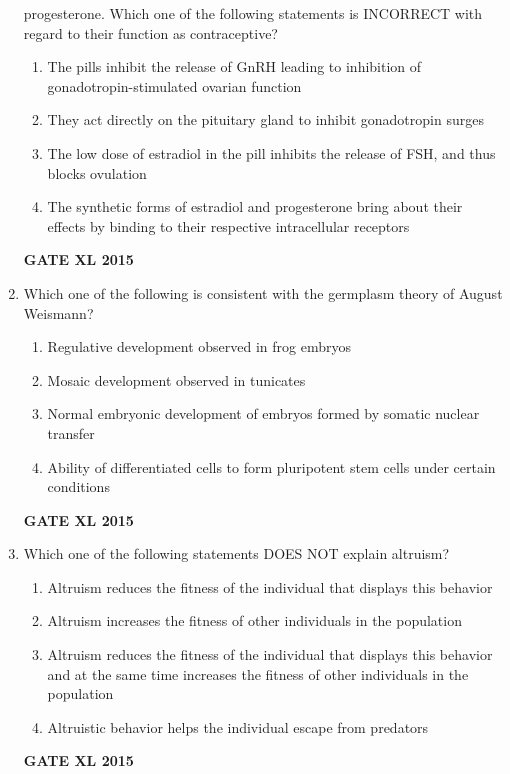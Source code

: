 \documentclass[journal,12pt,onecolumn]{IEEEtran}
\begin{document}
\begin{enumerate}
progesterone. Which one of the following statements is INCORRECT with regard to their function as contraceptive?
    \begin{enumerate}
            \item  The pills inhibit the release of GnRH leading to inhibition of gonadotropin-stimulated ovarian function
	    \item  They act directly on the pituitary gland to inhibit gonadotropin surges
	    \item The low dose of estradiol in the pill inhibits the release of FSH, and thus blocks ovulation
            \item The synthetic forms of estradiol and progesterone bring about their effects by binding to their respective intracellular receptors
    \end{enumerate}
\hfill{\textbf{GATE XL 2015}}
\item Which one of the following is consistent with the germplasm theory of August Weismann?
    \begin{enumerate}
            \item Regulative development observed in frog embryos
	    \item Mosaic development observed in tunicates
	    \item Normal embryonic development of embryos formed by somatic nuclear transfer
            \item Ability of differentiated cells to form pluripotent stem cells under certain conditions
    \end{enumerate}
\hfill{\textbf{GATE XL 2015}}
\item Which one of the following statements DOES NOT explain altruism?
    \begin{enumerate}
            \item Altruism reduces the fitness of the individual that displays this behavior
	    \item Altruism increases the fitness of other individuals in the population
	    \item Altruism reduces the fitness of the individual that displays this behavior and at the same time
increases the fitness of other individuals in the population
            \item  Altruistic behavior helps the individual escape from predators
    \end{enumerate}
\hfill{\textbf{GATE XL 2015}}
	


\end{enumerate}
\end{document}
